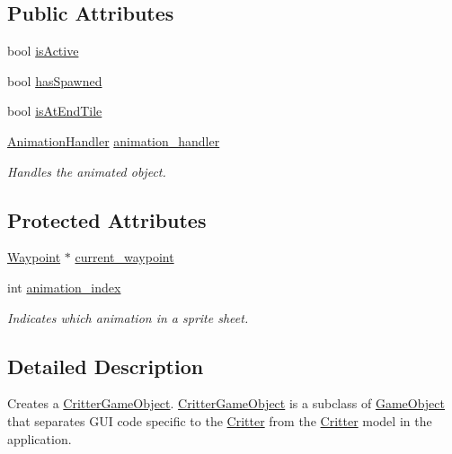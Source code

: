 \subsection*{Public Attributes}
\begin{DoxyCompactItemize}
\item 
bool \hyperlink{class_critter_game_object_a9e8edd5ea266b18433e9b9f0f3184b97}{is\+Active}
\item 
bool \hyperlink{class_critter_game_object_ad703baff6e0d35129dadc48172c26353}{has\+Spawned}
\item 
bool \hyperlink{class_critter_game_object_a21c4863faaf8fc2c0314575c07764ce4}{is\+At\+End\+Tile}
\item 
\hyperlink{class_animation_handler}{Animation\+Handler} \hyperlink{class_critter_game_object_aaf2540f8bf0e841fb1f7ffba4afe9b3d}{animation\+\_\+handler}
\begin{DoxyCompactList}\small\item\em Handles the animated object. \end{DoxyCompactList}\end{DoxyCompactItemize}
\subsection*{Protected Attributes}
\begin{DoxyCompactItemize}
\item 
\hyperlink{class_waypoint}{Waypoint} $\ast$ \hyperlink{class_critter_game_object_a1c661287931e114c68e7cd16a1bf5d47}{current\+\_\+waypoint}
\item 
int \hyperlink{class_critter_game_object_a24da2fb9666d41d47a736278f9305d95}{animation\+\_\+index}
\begin{DoxyCompactList}\small\item\em Indicates which animation in a sprite sheet. \end{DoxyCompactList}\end{DoxyCompactItemize}


\subsection{Detailed Description}
Creates a \hyperlink{class_critter_game_object}{Critter\+Game\+Object}. \hyperlink{class_critter_game_object}{Critter\+Game\+Object} is a subclass of \hyperlink{class_game_object}{Game\+Object} that separates G\+U\+I code specific to the \hyperlink{class_critter}{Critter} from the \hyperlink{class_critter}{Critter} model in the application. 

